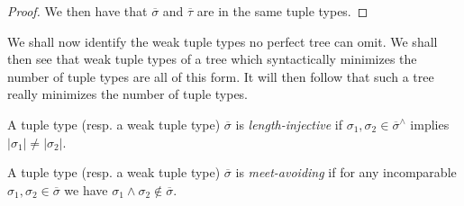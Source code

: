 \begin{proof}
We then have that $\overline{\sigma}$ and $\overline{\tau}$ are in the same tuple types.
\end{proof}

We shall now identify the weak tuple types no perfect tree can omit. We shall then see that weak tuple types of a tree which syntactically minimizes the number of tuple types are all of this form. It will then follow that such a tree really minimizes the number of tuple types.

\begin{definition}
A tuple type (resp. a weak tuple type) $\overline{\sigma}$ is \emph{length-injective} if $\sigma_1,\sigma_2 \in \overline{\sigma}^{\wedge}$ implies $|\sigma_1| \neq |\sigma_2|$.
\end{definition}

\begin{definition}
A tuple type (resp. a weak tuple type) $\overline{\sigma}$ is \emph{meet-avoiding} if for any incomparable $\sigma_1,\sigma_2 \in \overline{\sigma}$ we have $\sigma_1 \wedge \sigma_2 \notin \overline{\sigma}$.
\end{definition}

